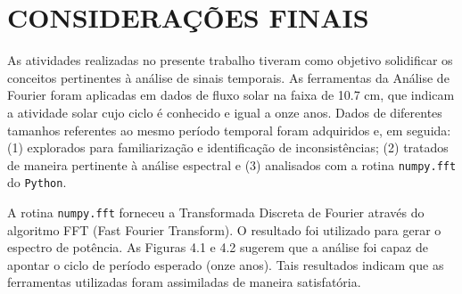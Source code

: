 
\chapter{CONSIDERAÇÕES FINAIS}

As atividades realizadas no presente trabalho tiveram como objetivo solidificar os conceitos pertinentes à análise de sinais temporais. As ferramentas da Análise de Fourier foram aplicadas em dados de fluxo solar na faixa de 10.7 cm, que indicam a atividade solar cujo ciclo é conhecido e igual a onze anos. Dados de diferentes tamanhos referentes ao mesmo período temporal foram adquiridos e, em seguida: (1) explorados para familiarização e identificação de inconsistências; (2) tratados de maneira pertinente à análise espectral e (3) analisados com a rotina \texttt{numpy.fft} do \texttt{Python}. 

A rotina \texttt{numpy.fft} forneceu a Transformada Discreta de Fourier através do algoritmo FFT (Fast Fourier Transform). O resultado foi utilizado para gerar o espectro de potência. As Figuras 4.1 e 4.2 sugerem que a análise foi capaz de apontar o ciclo de período esperado (onze anos). Tais resultados indicam que as ferramentas utilizadas foram assimiladas de maneira satisfatória.

